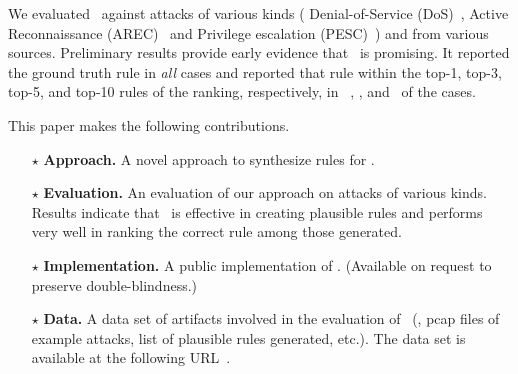 \documentclass[conference]{IEEEtran}
\begin{document}

We evaluated \tname\ against \totalAttacks attacks of various kinds
(\eg{} Denial-of-Service (DoS)~\cite{denial-of-service}, Active
Reconnaissance (AREC)~\cite{active-reconnaissance} and Privilege
escalation (PESC)~\cite{privilege-escalation}) and from various
sources. Preliminary results provide early evidence that \tname\ is
promising. It reported the ground truth rule in \emph{all} cases and
reported that rule within the top-1, top-3, top-5, and top-10 rules of
the ranking, respectively, in \percTopOneRanking\,
\percTopThreeRanking, \percTopFiveRanking, and \percTopTenRanking\ of
the cases.





This paper makes the following contributions.

\newcommand{\Contrib}[1]{$\star$#1}
\begin{itemize}[topsep=.2ex,itemsep=.2ex,leftmargin=0.8em]

\item[\Contrib{}]\textbf{Approach.} A novel approach to synthesize
  rules for \nids.

\item[\Contrib{}]\textbf{Evaluation.} An evaluation of our approach on
  attacks of various kinds. Results indicate that \tname\ is effective
  in creating plausible rules and performs very well in ranking the
  correct rule among those generated.

\item[\Contrib{}]\textbf{Implementation.} A public implementation of
  \tname. (Available on request to preserve double-blindness.)

\item[\Contrib{}]\textbf{Data.} A data set of artifacts involved in
  the evaluation of \tname\ (\eg{}, pcap files of example attacks, list
  of plausible rules generated, etc.). The data set is available at
  the following URL~\ourdataset.
  
\end{itemize}
\end{document}
